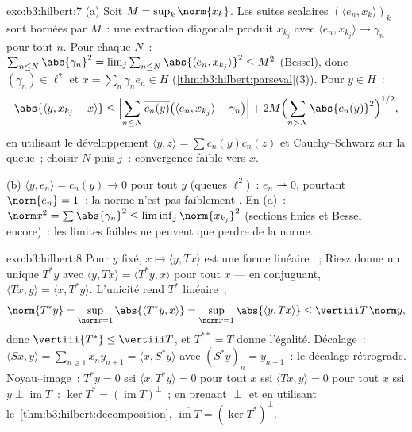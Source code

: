 \begin{solution}{exo:b3:hilbert:7}
(a) Soit $M = \sup_k\norm{x_k}$. Les suites scalaires
$(\langle e_n, x_k\rangle)_k$ sont bornées par $M$~: une
extraction diagonale produit $x_{k_j}$ avec $\langle e_n,
x_{k_j}\rangle \to \gamma_n$ pour tout $n$. Pour chaque $N$~:
$\sum_{n\leq N}\abs{\gamma_n}^2 = \lim_j\sum_{n\leq
N}\abs{\langle e_n, x_{k_j}\rangle}^2 \leq M^2$ (Bessel), donc
$(\gamma_n) \in \ell^2$ et $x = \sum_n\gamma_ne_n \in H$
(\cref{thm:b3:hilbert:parseval}(3)). Pour $y \in H$~:
\[
\abs{\langle y, x_{k_j} - x\rangle}
\leq \Bigl|\sum_{n\leq N}\overline{c_n(y)}\bigl(\langle e_n,
x_{k_j}\rangle - \gamma_n\bigr)\Bigr|
+ 2M\Bigl(\sum_{n>N}\abs{c_n(y)}^2\Bigr)^{1/2},
\]
en utilisant le développement $\langle y, z\rangle =
\sum\overline{c_n(y)}c_n(z)$ et Cauchy--Schwarz sur la queue~;
choisir $N$ puis $j$~: convergence faible vers $x$.

(b) $\langle y, e_n\rangle = c_n(y) \to 0$ pour tout $y$
(queues $\ell^2$)~: $e_n \rightharpoonup 0$, pourtant
$\norm{e_n} = 1$~: la norme n'est pas faiblement . En
(a)~: $\norm x^2 = \sum\abs{\gamma_n}^2 \leq
\liminf_j\norm{x_{k_j}}^2$ (sections finies et Bessel encore)~:
les limites faibles ne peuvent que perdre de la norme.
\end{solution}

\begin{solution}{exo:b3:hilbert:8}
Pour $y$ fixé, $x \mapsto \langle y, Tx\rangle$ est une forme
linéaire ~; Riesz donne un unique $T^*y$ avec
$\langle y, Tx\rangle = \langle T^*y, x\rangle$ pour tout $x$
--- en conjuguant, $\langle Tx, y\rangle = \langle x,
T^*y\rangle$. L'unicité rend $T^*$ linéaire~;
\[
\norm{T^*y} = \sup_{\norm x = 1}\abs{\langle T^*y, x\rangle}
= \sup_{\norm x=1}\abs{\langle y, Tx\rangle}
\leq \vertiii T\,\norm y,
\]
donc $\vertiii{T^*} \leq \vertiii T$, et $T^{**} = T$ donne
l'égalité. Décalage~: $\langle Sx, y\rangle = \sum_{n\geq1}
x_n\bar y_{n+1} = \langle x, S^*y\rangle$ avec $(S^*y)_n =
y_{n+1}$~: le décalage rétrograde. Noyau--image~: $T^*y = 0$
ssi $\langle x, T^*y\rangle = 0$ pour tout $x$ ssi $\langle
Tx, y\rangle = 0$ pour tout $x$ ssi $y \perp
\operatorname{im}T$~: $\ker T^* = (\operatorname{im}T)^\perp$~;
en prenant $\perp$ et en utilisant
le~\cref{thm:b3:hilbert:decomposition},
$\overline{\operatorname{im}T} = (\ker T^*)^\perp$.
\end{solution}

